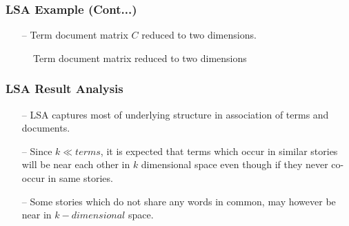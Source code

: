 \documentclass{beamer}
\begin{document}
\begin{frame}[noframenumbering]
\frametitle{LSA Example (Cont...)}


\begin{itemize}
\item[--] Term document matrix $C$ reduced to two dimensions. \hyperlink{Story Classification using Keyword based Features}{\beamerreturnbutton{}}
\end{itemize}
\begin{figure}[h] 
\centering
{}
\centering
\caption{Term document matrix reduced to two dimensions}
\label{Dimension_Reduction_LSA}
\end{figure}

\end{frame}


\begin{frame}[noframenumbering] \label{LSA Analysis} 
\frametitle{LSA Result Analysis}
\begin{itemize}
\item[--] LSA captures most of underlying structure in association of terms and documents.
\item[--] Since $k \ll terms$, it is expected that terms which occur in similar stories will be near each other in $k$ dimensional space even though if they never co-occur in same stories.
\item[--] Some stories which do not share any words in common, may however be near in $k-dimensional$ space.

\hyperlink{Keyword Result Analysis}{\beamerreturnbutton{}}
\end{itemize}
\end{frame}
\end{document}
